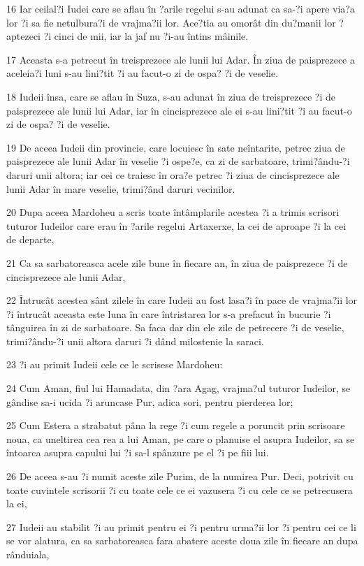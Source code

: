 \par 16 Iar ceilal?i Iudei care se aflau în ?arile regelui s-au adunat ca sa-?i apere via?a lor ?i sa fie netulbura?i de vrajma?ii lor. Ace?tia au omorât din du?manii lor ?aptezeci ?i cinci de mii, iar la jaf nu ?i-au întins mâinile.
\par 17 Aceasta s-a petrecut în treisprezece ale lunii lui Adar. În ziua de paisprezece a aceleia?i luni s-au lini?tit ?i au facut-o zi de ospa? ?i de veselie.
\par 18 Iudeii însa, care se aflau în Suza, s-au adunat în ziua de treisprezece ?i de paisprezece ale lunii lui Adar, iar în cincisprezece ale ei s-au lini?tit ?i au facut-o zi de ospa? ?i de veselie.
\par 19 De aceea Iudeii din provincie, care locuiesc în sate neîntarite, petrec ziua de paisprezece ale lunii Adar în veselie ?i ospe?e, ca zi de sarbatoare, trimi?ându-?i daruri unii altora; iar cei ce traiesc în ora?e petrec ?i ziua de cincisprezece ale lunii Adar în mare veselie, trimi?ând daruri vecinilor.
\par 20 Dupa aceea Mardoheu a scris toate întâmplarile acestea ?i a trimis scrisori tuturor Iudeilor care erau în ?arile regelui Artaxerxe, la cei de aproape ?i la cei de departe,
\par 21 Ca sa sarbatoreasca acele zile bune în fiecare an, în ziua de paisprezece ?i de cincisprezece ale lunii Adar,
\par 22 Întrucât acestea sânt zilele în care Iudeii au fost lasa?i în pace de vrajma?ii lor ?i întrucât aceasta este luna în care întristarea lor s-a prefacut în bucurie ?i tânguirea în zi de sarbatoare. Sa faca dar din ele zile de petrecere ?i de veselie, trimi?ându-?i unii altora daruri ?i dând milostenie la saraci.
\par 23 ?i au primit Iudeii cele ce le scrisese Mardoheu:
\par 24 Cum Aman, fiul lui Hamadata, din ?ara Agag, vrajma?ul tuturor Iudeilor, se gândise sa-i ucida ?i aruncase Pur, adica sori, pentru pierderea lor;
\par 25 Cum Estera a strabatut pâna la rege ?i cum regele a poruncit prin scrisoare noua, ca uneltirea cea rea a lui Aman, pe care o planuise el asupra Iudeilor, sa se întoarca asupra capului lui ?i sa-l spânzure pe el ?i pe fiii lui.
\par 26 De aceea s-au ?i numit aceste zile Purim, de la numirea Pur. Deci, potrivit cu toate cuvintele scrisorii ?i cu toate cele ce ei vazusera ?i cu cele ce se petrecusera la ei,
\par 27 Iudeii au stabilit ?i au primit pentru ei ?i pentru urma?ii lor ?i pentru cei ce li se vor alatura, ca sa sarbatoreasca fara abatere aceste doua zile în fiecare an dupa rânduiala,
